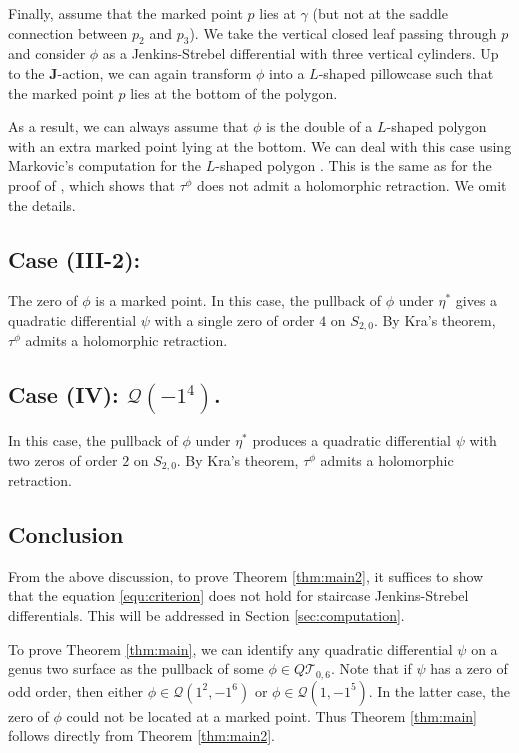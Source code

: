 \documentclass[11pt]{amsart}
\theoremstyle{plain}
\newcommand{\Tei}{\mathcal{T}}
\newcommand{\Q}{\mathcal{Q}}
\newcommand{\rot}{\mathbf{J}}
\begin{document}
Finally, assume that the marked point $p$ lies at $\gamma$ (but not at the saddle connection between $p_2$ and $p_3$). We take the vertical closed leaf passing through $p$ and consider
$\phi$ as a Jenkins-Strebel differential with three vertical cylinders. 
Up to the $\rot$-action, we can again transform $\phi$ into a $L$-shaped pillowcase such that the marked point $p$ lies at the bottom of the polygon.

As a result, we can always assume that $\phi$ is the double of a $L$-shaped polygon
with an extra marked point lying at the bottom. We can deal with this case 
using Markovic's computation for the $L$-shaped polygon \cite{Markovic2018}.
This is the same as for the proof of \cite[Theorem 1.1]{Markovic2018}, which shows that 
 $\tau^\phi$ does not admit a holomorphic retraction. We omit the details.








\subsection*{Case (III-2):}  The zero of $\phi$ is a marked point. 
In this case, the pullback of  $\phi$ under $\eta^*$ gives a quadratic differential
$\psi$ with a single zero of order $4$ on $S_{2,0}$. By Kra's theorem,  $\tau^{\phi}$ admits a holomorphic retraction. 


\subsection{Case (IV): $\Q(-1^4)$.}\label{Case-IV}
In this case, the pullback of  $\phi$ under $\eta^*$ produces a quadratic differential
$\psi$ with two zeros of order $2$ on $S_{2,0}$. By Kra's theorem,  $\tau^{\phi}$ admits a holomorphic retraction. 


\subsection{Conclusion}

From the above discussion, to prove Theorem \ref{thm:main2}, it suffices to show that 
 the equation \eqref{equ:criterion} does not hold for  staircase Jenkins-Strebel differentials.  This will be addressed in Section \ref{sec:computation}.
 

To prove Theorem \ref{thm:main}, we can identify any quadratic differential 
$\psi$ on a genus two surface as the pullback of some $\phi\in Q\Tei_{0,6}$. 
Note that if $\psi$ has a zero of odd order, then either $\phi\in \mathcal{Q}(1^2,-1^6)$ or  $\phi\in \mathcal{Q}(1,-1^5)$. In the latter case,
the zero of $\phi$ could not be located at a marked point. Thus Theorem \ref{thm:main}
follows directly from Theorem \ref{thm:main2}.
\end{document}

